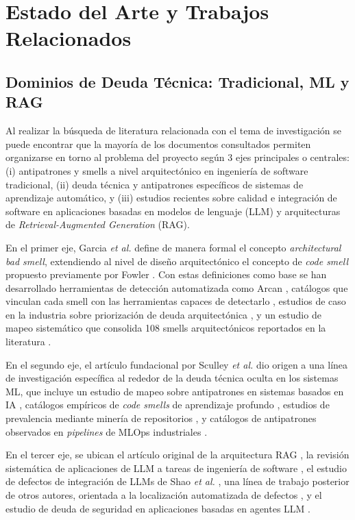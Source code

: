 \section{Estado del Arte y Trabajos Relacionados}

\subsection{Dominios de Deuda Técnica: Tradicional, ML y RAG}
Al realizar la búsqueda de literatura relacionada con el tema de investigación se puede encontrar que la mayoría de los documentos consultados permiten organizarse en torno al problema del proyecto según 3 ejes principales o centrales: (i) antipatrones y smells a nivel arquitectónico en ingeniería de software tradicional, (ii) deuda técnica y antipatrones específicos de sistemas de aprendizaje automático, y (iii) estudios recientes sobre calidad e integración de software en aplicaciones basadas en modelos de lenguaje (LLM) y arquitecturas de \textit{Retrieval-Augmented Generation} (RAG).
 
En el primer eje, Garcia \textit{et al.} \cite{garcia_identifying_2009} define de manera formal el concepto \textit{architectural bad smell}, extendiendo al nivel de diseño arquitectónico el concepto de \textit{code smell} propuesto previamente por Fowler \cite{fowler_1999}. Con estas definiciones como base se han desarrollado herramientas de detección automatizada como Arcan \cite{fontana_arcan_2017}, catálogos que vinculan cada smell con las herramientas capaces de detectarlo \cite{azadi_architectural_2019}, estudios de caso en la industria sobre priorización de deuda arquitectónica \cite{martini_identifying_2018}, y un estudio de mapeo sistemático que consolida 108 smells arquitectónicos reportados en la literatura \cite{mumtaz_systematic_2021}. 

En el segundo eje, el artículo fundacional por Sculley \textit{et al.} \cite{sculley_hidden_2015} dio origen a una línea de investigación específica al rededor de la deuda técnica oculta en los sistemas ML, que incluye un estudio de mapeo sobre antipatrones en sistemas basados en IA \cite{bogner_characterizing_2021}, catálogos empíricos de \textit{code smells} de aprendizaje profundo \cite{gesi_code_2022,zhang_code_2022}, estudios de prevalencia mediante minería de repositorios \cite{oort_prevalence_2021,jebnoun_scent_2020}, y catálogos de antipatrones observados en \textit{pipelines} de MLOps industriales \cite{muralidhar_using_2021}. 

En el tercer eje, se ubican el artículo original de la arquitectura RAG \cite{lewis_retrieval-augmented_2021}, la revisión sistemática de aplicaciones de LLM a tareas de ingeniería de software \cite{hou_large_2024}, el estudio  de defectos de integración de LLMs de Shao \textit{et al.} \cite{shao_are_2024}, una línea de trabajo posterior de otros autores, orientada a la localización automatizada de defectos \cite{tan_lidl_2026}, y el estudio de deuda de seguridad en aplicaciones basadas en agentes LLM \cite{shen_security_2025}. 

